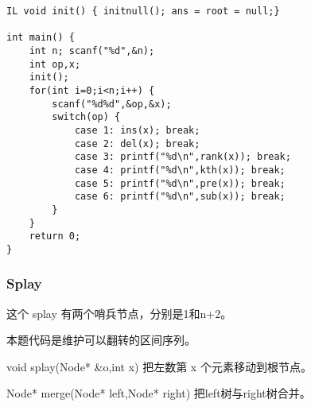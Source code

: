 \documentclass[UTF8]{ctexart}
\begin{document}
\begin{framed}
\begin{lstlisting}
IL void init() { initnull(); ans = root = null;}

int main() {
    int n; scanf("%d",&n);
    int op,x;
    init();
    for(int i=0;i<n;i++) {
        scanf("%d%d",&op,&x);
        switch(op) {
            case 1: ins(x); break;
            case 2: del(x); break;
            case 3: printf("%d\n",rank(x)); break;
            case 4: printf("%d\n",kth(x)); break;
            case 5: printf("%d\n",pre(x)); break;
            case 6: printf("%d\n",sub(x)); break;
        }
    }
    return 0;
} 
\end{lstlisting}
\end{framed}

\subsubsection{Splay}
这个 splay 有两个哨兵节点，分别是1和n+2。

本题代码是维护可以翻转的区间序列。

void splay(Node* \&o,int x) 把左数第 x 个元素移动到根节点。

Node* merge(Node* left,Node* right) 把left树与right树合并。
\end{document}
